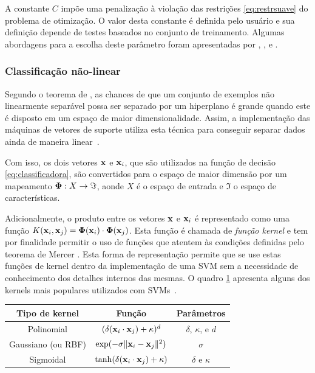 A constante $C$ impõe uma penalização à violação das restrições \ref{eq:restrsuave} do problema de otimização. O valor desta constante é definida pelo usuário e sua definição depende de testes baseados no conjunto de treinamento. Algumas abordagens para a escolha deste parâmetro foram apresentadas por , ,  e \cite{ben2010user}.


\subsubsection{Classificação não-linear}\label{sec:naolinear}

Segundo o teorema de , as chances de que um conjunto de exemplos não linearmente separável possa ser separado por um hiperplano é grande quando este é disposto em um espaço de maior dimensionalidade. Assim, a implementação das máquinas de vetores de suporte utiliza esta técnica para conseguir separar dados ainda de maneira linear~\cite{burges1998tutorial}.

Com isso, os dois vetores $\mathbf{x}$ e $\mathbf{x}_i$, que são utilizados na função de decisão \ref{eq:classificadora}, são convertidos para o espaço de maior dimensão por um mapeamento $\mathbf{\Phi}: X \rightarrow \Im$, aonde $X$ é o espaço de entrada e $\Im$ o espaço de características.

Adicionalmente, o produto entre os vetores $\mathbf{x}$ e $\mathbf{x}_i$ é representado como uma função $K(\mathbf{x}_i, \mathbf{x}_j) = \mathbf{\Phi}(\mathbf{x}_i)\cdot\mathbf{\Phi}(\mathbf{x}_j)$. Esta função é chamada de \emph{função kernel} e tem por finalidade permitir o uso de funções que atentem às condições definidas pelo teorema de Mercer \cite[p. 141]{burges1998tutorial}. Esta forma de representação permite que se use estas funções de kernel dentro da implementação de uma SVM sem a necessidade de conhecimento dos detalhes internos das mesmas. O quadro \ref{quadro:kernels} apresenta alguns dos kernels mais populares utilizados com SVMs~\cite{lorena2003introducaoas}.

\begin{table}
\centering
\begin{tabular}{|c|c|c|}
\hline
Tipo de kernel & Função & Parâmetros \\
\hline
Polinomial & $(\delta(\mathbf{x}_i\cdot\mathbf{x}_j)+\kappa)^d$ & $\delta$, $\kappa$, e $d$ \\
Gaussiano (ou RBF) & $\exp(-\sigma\lVert \mathbf{x}_i-\mathbf{x}_j \rVert^2)$ & $\sigma$ \\
Sigmoidal & $\tanh(\delta(\mathbf{x}_i\cdot\mathbf{x}_j)+\kappa)$ & $\delta$ e $\kappa$ \\
\hline
\end{tabular}
\label{quadro:kernels}
\end{table}

